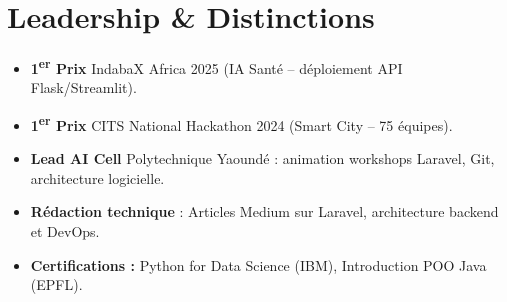 \documentclass[a4paper,11pt]{article}
\begin{document}
\section{Leadership \& Distinctions}
\begin{itemize}[leftmargin=*, label=\tiny$\bullet$, nosep]
    \item \small{\textbf{1\textsuperscript{er} Prix} IndabaX Africa 2025 (IA Santé -- déploiement API Flask/Streamlit).}
    \item \small{\textbf{1\textsuperscript{er} Prix} CITS National Hackathon 2024 (Smart City -- 75 équipes).}
    \item \small{\textbf{Lead AI Cell} Polytechnique Yaoundé : animation workshops Laravel, Git, architecture logicielle.}
    \item \small{\textbf{Rédaction technique} : Articles Medium sur Laravel, architecture backend et DevOps.}
    \item \small{\textbf{Certifications :} Python for Data Science (IBM), Introduction POO Java (EPFL).}
\end{itemize}
\end{document}
